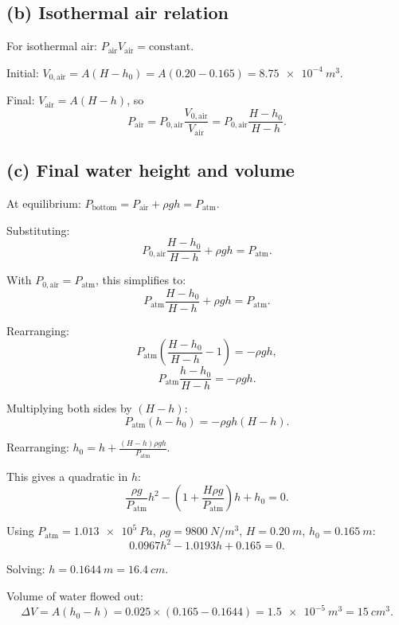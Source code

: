 \documentclass[11pt]{article}
\newcommand{\ans}[1]{\boxed{\displaystyle #1}}
\begin{document}
\subsection*{(b) Isothermal air relation}
For isothermal air: \(P_{\text{air}} V_{\text{air}} = \text{constant}\).

Initial: \(V_{0,\text{air}} = A(H - h_0) = A(0.20 - 0.165) = \SI{8.75e-4}{m^3}\).

Final: \(V_{\text{air}} = A(H - h)\), so
\[
P_{\text{air}} = P_{0,\text{air}} \frac{V_{0,\text{air}}}{V_{\text{air}}}
= P_{0,\text{air}} \frac{H - h_0}{H - h}.
\]

\subsection*{(c) Final water height and volume}
At equilibrium: \(P_{\text{bottom}} = P_{\text{air}} + \rho g h = P_{\text{atm}}\).

Substituting:
\[
P_{0,\text{air}} \frac{H - h_0}{H - h} + \rho g h = P_{\text{atm}}.
\]

With \(P_{0,\text{air}} = P_{\text{atm}}\), this simplifies to:
\[
P_{\text{atm}} \frac{H - h_0}{H - h} + \rho g h = P_{\text{atm}}.
\]

Rearranging:
\[
P_{\text{atm}} \left(\frac{H - h_0}{H - h} - 1\right) = -\rho g h,
\]
\[
P_{\text{atm}} \frac{h - h_0}{H - h} = -\rho g h.
\]

Multiplying both sides by \((H - h)\):
\[
P_{\text{atm}}(h - h_0) = -\rho g h (H - h).
\]

Rearranging: \(h_0 = h + \frac{(H-h)\rho g h}{P_{\text{atm}}}\).

This gives a quadratic in \(h\):
\[
\frac{\rho g}{P_{\text{atm}}} h^2 - \left(1 + \frac{H\rho g}{P_{\text{atm}}}\right)h + h_0 = 0.
\]

Using \(P_{\text{atm}} = \SI{1.013e5}{Pa}\), \(\rho g = \SI{9800}{N/m^3}\), \(H = \SI{0.20}{m}\), \(h_0 = \SI{0.165}{m}\):
\[
0.0967 h^2 - 1.0193 h + 0.165 = 0.
\]

Solving: \(h = \SI{0.1644}{m} = \SI{16.4}{cm}\).

Volume of water flowed out:
\[
\Delta V = A(h_0 - h) = 0.025 \times (0.165 - 0.1644) = \ans{\SI{1.5e-5}{m^3} = \SI{15}{cm^3}}.
\]
\end{document}
